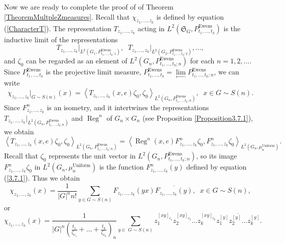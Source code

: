 \documentclass[12pt]{amsart}
\theoremstyle{definition}
\numberwithin{equation}{section}
\DeclareMathOperator{\Ewens}{Ewens}
\DeclareMathOperator{\Uniform}{Uniform}
\DeclareMathOperator{\Reg}{Reg}
\begin{document}
Now we are ready to complete the proof of
of Theorem \ref{TheoremMultpleZmeasures}. Recall that $\chi_{z_1,\ldots,z_k}$ is defined by equation (\ref{CharacterT}). The representation $T_{z_1,\ldots,z_k}$ acting in $L^2\left(\mathfrak{S}_G,P_{t_1,\ldots,t_k}^{\Ewens}\right)$ is the inductive limit of the representations
$$
T_{z_1,\ldots,z_k}\biggl|_{ L^2\left(G_1, P_{t_1,\ldots,t_k;1}^{\Ewens}\right)},\;\;T_{z_1,\ldots,z_k}\biggl|_{ L^2\left(G_2, P_{t_1,\ldots,t_k;2}^{\Ewens}\right)},\ldots ,
$$
and $\zeta_0$ can be regarded as an element of $L^2\left(G_n, P_{t_1,\ldots,t_k;n}^{\Ewens}\right)$ for each $n=1,2,\ldots$. Since
$P^{\Ewens}_{t_1,\ldots,t_k}$ is the projective limit measure,
$P^{\Ewens}_{t_1,\ldots,t_k}=\underset{\longleftarrow}{\lim}
P_{t_1,\ldots,t_k;n}^{\Ewens}$, we can write
\begin{equation}
\chi_{z_1,\ldots,z_k}\biggl|_{G\sim S(n)}(x)=\left\langle T_{z_1,\ldots,z_k}(x,e)\zeta_0,\zeta_0\right\rangle_{L^2\left(G_n,P_{t_1,\ldots,t_k;n}^{\Ewens}\right)},\;\; x\in G\sim S(n).
\end{equation}
Since $F^n_{z_1,\ldots,z_k}$ is an isometry, and it intertwines the representations
$T_{z_1,\ldots,z_k}\biggl|_{L^2\left(G_n, P_{t_1,\ldots,t_k;n}^{\Ewens}\right)}$
and $\Reg^n$ of $G_n\times G_n$ (see Proposition \ref{Proposition3.7.1}),
we obtain
\begin{equation}
\left\langle T_{z_1,\ldots,z_k}(x,e)\zeta_0,\zeta_0
\right\rangle_{L^2\left(G_n,P_{t_1,\ldots,t_k;n}^{\Ewens}\right)}
=\left\langle\Reg^n(x,e) F_{z_1,\ldots,z_k}^n\zeta_0, F_{z_1,\ldots,z_k}^{n}\zeta_0\right\rangle_{L^2\left(G_n,\mu_n^{\Uniform}\right)}.
\end{equation}
Recall that $\zeta_0$ represents the unit vector in $L^2\left(G_n,P_{t_1,\ldots,t_k;n}^{\Ewens}\right)$, so its image $F_{z_1,\ldots,z_k}^n\zeta_0$
in $L^2\left(G_n,\mu_n^{\Uniform}\right)$ is the function $F_{z_1,\ldots,z_k}^n(y)$ defined by equation (\ref{3.7.1}).  Thus we obtain
\begin{equation}
\chi_{z_1,\ldots,z_k}(x)=\frac{1}{|G|^nn!}\sum\limits_{y\in G\sim S(n)}F_{z_1,\ldots,z_k}(yx)
\overline{F_{z_1,\ldots,z_k}(y)},\;\; x\in G\sim S(n),
\end{equation}
or
\begin{equation}
\chi_{z_1,\ldots,z_k}(x)=
\frac{1}{\left|G\right|^n
\left(\frac{t_1}{\zeta_{c_1}}+\ldots+\frac{t_k}{\zeta_{c_k}}\right)_n}
\sum\limits_{y\in\; G\sim S(n)}z_1^{[xy]_{c_1}}z_2^{[xy]_{c_2}}\ldots z_k^{[xy]_{c_k}}
\overline{z_1^{[y]}z_2^{[y]}\ldots z_k^{[y]}}.
\end{equation}
\end{document}

